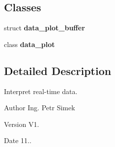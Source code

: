 \subsection*{Classes}
\begin{DoxyCompactItemize}
\item 
struct \textbf{ data\+\_\+plot\+\_\+buffer}
\item 
class \textbf{ data\+\_\+plot}
\end{DoxyCompactItemize}


\subsection{Detailed Description}
Interpret real-\/time data. 

\begin{DoxyAuthor}{Author}
Ing. Petr Simek 
\end{DoxyAuthor}
\begin{DoxyVersion}{Version}
V1. 
\end{DoxyVersion}
\begin{DoxyDate}{Date}
11.. 
\end{DoxyDate}
